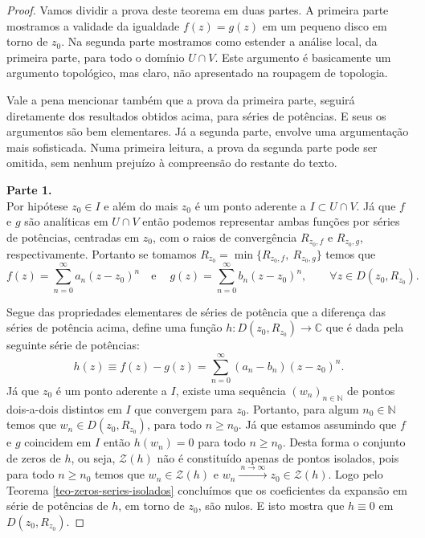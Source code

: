 \begin{proof}
Vamos dividir a prova deste teorema em duas partes. A primeira parte
mostramos a validade da igualdade $f(z)=g(z)$ em um pequeno disco em torno de $z_0$.
Na segunda parte mostramos como estender a análise local, da primeira parte, 
para todo o domínio $U\cap V$. Este argumento é basicamente um argumento topológico,
mas claro, não apresentado na roupagem de topologia.


\bigskip 
Vale a pena mencionar também que a prova da primeira parte, 
seguirá diretamente dos resultados obtidos
acima, para séries de potências. E seus os argumentos são bem elementares. 
Já a segunda parte, envolve uma argumentação mais sofisticada. 
Numa primeira leitura, a prova da segunda parte pode ser omitida,
sem nenhum prejuízo à compreensão do restante do texto. 

 

\bigskip
\noindent\textbf{Parte 1.}
\\
Por hipótese $z_0\in I$ e além do mais $z_0$ é um ponto aderente a 
$I\subset U\cap V$. 
Já que $f$ e $g$ são analíticas em $U\cap V$ então podemos representar
ambas funções por séries de potências, centradas em $z_0$, com o 
raios de convergência $R_{z_0,f}$ e $R_{z_0,g}$, respectivamente.
Portanto se tomamos $R_{z_0} = \min\{R_{z_0,f},\ R_{z_0,g}\}$ temos que 
\[
f(z) = \sum_{n=0}^{\infty} a_n(z-z_0)^n
\quad \text{e}\ \quad 
g(z) = \sum_{n=0}^{\infty} b_n(z-z_0)^n,
\qquad \forall z\in D(z_0,R_{z_0}).
\]

Segue das propriedades elementares de séries de potência que a diferença das 
séries de potência acima, define uma função $h:D(z_0,R_{z_0})\to\mathbb{C}$
que é dada pela seguinte série de potências:
\[
h(z) \equiv f(z)-g(z) = \sum_{n=0}^{\infty} (a_n-b_n)(z-z_0)^n.
\]
Já que $z_0$ é um ponto aderente a $I$, existe uma 
sequência $(w_n)_{n\in\mathbb{N}}$ de pontos dois-a-dois distintos em $I$ que convergem
para $z_0$. Portanto, para algum $n_0\in\mathbb{N}$ 
temos que $w_n\in D(z_0,R_{z_0})$, para todo $n\geqslant n_0$.
Já que estamos assumindo que $f$ e $g$ coincidem em $I$
então $h(w_n)=0$ para todo $n\geqslant n_0$. 
Desta forma o conjunto de zeros de $h$, ou seja, $\mathcal{Z}(h)$
não é constituído apenas de pontos isolados, pois para todo $n\geqslant n_0$ 
temos que $w_n\in \mathcal{Z}(h)$ e $w_n\xrightarrow{\ n\to\infty\ } z_0\in \mathcal{Z}(h)$.
Logo pelo Teorema \ref{teo-zeros-series-isolados} concluímos que 
os coeficientes da expansão em série de potências de $h$, em torno de $z_0$,
são nulos. E isto mostra que $h\equiv 0$ em $D(z_0,R_{z_0})$.



\end{proof}
